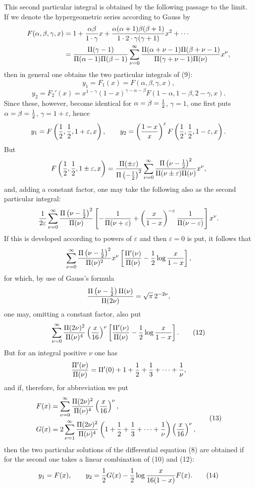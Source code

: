 \documentclass[11pt]{article}
\begin{document}
This second particular integral is obtained by the following passage to the limit. If we denote the hypergeometric series according to Gauss by
\[
\begin{aligned}
F(\alpha,\beta,\gamma,x)
&=1+{\alpha\beta\over1\cdot\gamma}x
+{\alpha(\alpha+1)\beta(\beta+1)\over1\cdot2\cdot\gamma(\gamma+1)}x^2+\cdots\\
&={\Pi(\gamma-1)\over\Pi(\alpha-1)\Pi(\beta-1)}
\sum_{\nu=0}^{\infty}{\Pi(\alpha+\nu-1)\Pi(\beta+\nu-1)\over\Pi(\gamma+\nu-1)\Pi(\nu)}x^\nu,
\end{aligned}
\]
then in general one obtains the two particular integrals of (9):
\[
y_1=F_1(x)=F(\alpha,\beta,\gamma,x),
\]
\[
y_2=F_2'(x)=x^{1-\gamma}(1-x)^{\gamma-\alpha-\beta}F(1-\alpha,1-\beta,2-\gamma,x).
\]
Since these, however, become identical for $\alpha=\beta={1\over2}$, $\gamma=1$, one first puts $\alpha=\beta={1\over2}$, $\gamma=1+\varepsilon$, hence
\[
y_1=F\left({1\over2},{1\over2},1+\varepsilon,x\right),
\qquad
 y_2=\left({1-x\over x}\right)^{\varepsilon}F\left({1\over2},{1\over2},1-\varepsilon,x\right).
\]
But
\[
F\left({1\over2},{1\over2},1\pm\varepsilon,x\right)
={\Pi(\pm\varepsilon)\over\Pi\left(-{1\over2}\right)^2}
\sum_{\nu=0}^{\infty}
{\Pi\left(\nu-{1\over2}\right)^2\over\Pi(\nu\pm\varepsilon)\Pi(\nu)}x^\nu,
\]
and, adding a constant factor, one may take the following also as the second particular integral:
\[
{1\over2\varepsilon}\sum_{\nu=0}^{\infty}{\Pi\left(\nu-{1\over2}\right)^2\over\Pi(\nu)}
\left[-{1\over\Pi(\nu+\varepsilon)}+
\left({x\over1-x}\right)^{-\varepsilon}{1\over\Pi(\nu-\varepsilon)}\right]x^\nu.
\]
If this is developed according to powers of $\varepsilon$ and then $\varepsilon=0$ is put, it follows that
\[
\sum_{\nu=0}^{\infty}{\Pi\left(\nu-{1\over2}\right)^2\over\Pi(\nu)^2}x^\nu
\left[{\Pi'(\nu)\over\Pi(\nu)}-{1\over2}\log{x\over1-x}\right],
\]
for which, by use of Gauss's formula
\[
{\Pi\left(\nu-{1\over2}\right)\Pi(\nu)\over\Pi(2\nu)}=\sqrt\pi\,2^{-2\nu},
\]
one may, omitting a constant factor, also put
\begin{equation}
\sum_{\nu=0}^{\infty}{\Pi(2\nu)^2\over\Pi(\nu)^4}\left({x\over16}\right)^\nu
\left[{\Pi'(\nu)\over\Pi(\nu)}-{1\over2}\log{x\over1-x}\right].
\tag{12}
\end{equation}
But for an integral positive $\nu$ one has
\[
{\Pi'(\nu)\over\Pi(\nu)}=\Pi'(0)+1+{1\over2}+{1\over3}+\cdots+{1\over\nu},
\]
and if, therefore, for abbreviation we put
\begin{equation}
\begin{aligned}
F(x)&=\sum_{\nu=0}^{\infty}{\Pi(2\nu)^2\over\Pi(\nu)^4}\left({x\over16}\right)^\nu,\\
G(x)&=2\sum_{\nu=1}^{\infty}{\Pi(2\nu)^2\over\Pi(\nu)^4}\left(1+{1\over2}+{1\over3}+\cdots+{1\over\nu}\right)\left({x\over16}\right)^\nu,
\end{aligned}
\tag{13}
\end{equation}
then the two particular solutions of the differential equation (8) are obtained if for the second one takes a linear combination of (10) and (12):
\begin{equation}
y_1=F(x),
\qquad
y_2={1\over2}G(x)-{1\over2}\log{x\over16(1-x)}F(x).
\tag{14}
\end{equation}
\end{document}
